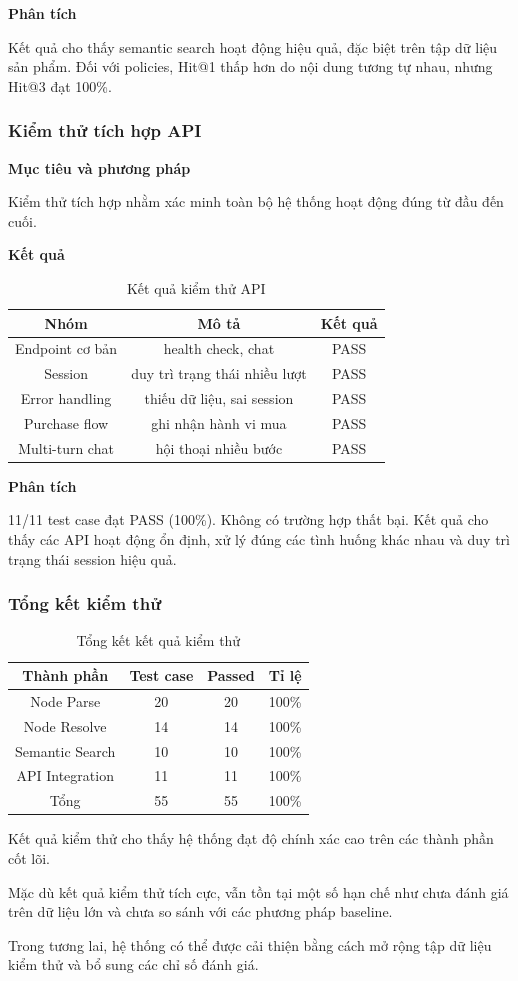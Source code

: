 \textbf{Phân tích}

Kết quả cho thấy semantic search hoạt động hiệu quả, đặc biệt trên tập dữ liệu sản phẩm. Đối với policies, Hit@1 thấp hơn do nội dung tương tự nhau, nhưng Hit@3 đạt 100\%.

\subsubsection{Kiểm thử tích hợp API}

\textbf{Mục tiêu và phương pháp}

Kiểm thử tích hợp nhằm xác minh toàn bộ hệ thống hoạt động đúng từ đầu đến cuối.

\textbf{Kết quả}

\begin{table}[h]
\centering
\small
\begin{tabular}{|c|c|c|}
\hline
Nhóm & Mô tả & Kết quả \\
\hline
Endpoint cơ bản & health check, chat & PASS \\
Session & duy trì trạng thái nhiều lượt & PASS \\
Error handling & thiếu dữ liệu, sai session & PASS \\
Purchase flow & ghi nhận hành vi mua & PASS \\
Multi-turn chat & hội thoại nhiều bước & PASS \\
\hline
\end{tabular}
\caption{Kết quả kiểm thử API}
\end{table}

\textbf{Phân tích}

11/11 test case đạt PASS (100\%). Không có trường hợp thất bại. Kết quả cho thấy các API hoạt động ổn định, xử lý đúng các tình huống khác nhau và duy trì trạng thái session hiệu quả. 

\subsubsection{Tổng kết kiểm thử}

\begin{table}[h]
\centering
\small
\begin{tabular}{|c|c|c|c|}
\hline
Thành phần & Test case & Passed & Tỉ lệ \\
\hline
Node Parse & 20 & 20 & 100\% \\
Node Resolve & 14 & 14 & 100\% \\
Semantic Search & 10 & 10 & 100\% \\
API Integration & 11 & 11 & 100\% \\
Tổng & 55 & 55 & 100\% \\
\hline
\end{tabular}
\caption{Tổng kết kết quả kiểm thử}
\end{table}

Kết quả kiểm thử cho thấy hệ thống đạt độ chính xác cao trên các thành phần cốt lõi.

Mặc dù kết quả kiểm thử tích cực, vẫn tồn tại một số hạn chế như chưa đánh giá trên dữ liệu lớn và chưa so sánh với các phương pháp baseline.

Trong tương lai, hệ thống có thể được cải thiện bằng cách mở rộng tập dữ liệu kiểm thử và bổ sung các chỉ số đánh giá.